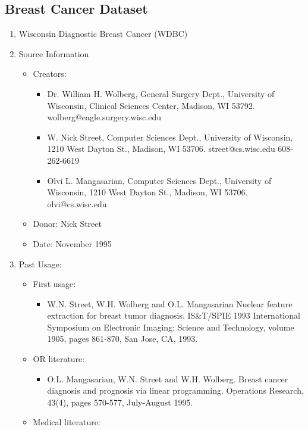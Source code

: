 \documentclass[12pt]{article}
\begin{document}
\subsection{Breast Cancer Dataset}
\begin{enumerate}
    \item Wisconsin Diagnostic Breast Cancer (WDBC)
    \item Source Information
    \begin{itemize}
        \item Creators:
        \begin{itemize}
            \item Dr. William H. Wolberg, General Surgery Dept., University of Wisconsin,  Clinical Sciences Center, Madison, WI 53792. wolberg@eagle.surgery.wisc.edu
            \item W. Nick Street, Computer Sciences Dept., University of Wisconsin, 1210 West Dayton St., Madison, WI 53706. street@cs.wisc.edu  608-262-6619
            \item Olvi L. Mangasarian, Computer Sciences Dept., University of Wisconsin, 1210 West Dayton St., Madison, WI 53706. olvi@cs.wisc.edu
        \end{itemize}
        \item Donor: Nick Street
        \item Date: November 1995
    \end{itemize}
    \item Past Usage:
    \begin{itemize}
        \item First usage:
        \begin{itemize}
            \item W.N. Street, W.H. Wolberg and O.L. Mangasarian Nuclear feature extraction for breast tumor diagnosis. IS&T/SPIE 1993 International Symposium on Electronic Imaging: Science and Technology, volume 1905, pages 861-870, San Jose, CA, 1993.
        \end{itemize}
        \item OR literature:
        \begin{itemize}
            \item O.L. Mangasarian, W.N. Street and W.H. Wolberg. Breast cancer diagnosis and prognosis via linear programming. Operations Research, 43(4), pages 570-577, July-August 1995.
        \end{itemize}
        \item Medical literature:
        \begin{itemize}

\end{itemize}
\end{itemize}
\end{enumerate}
\end{document}
